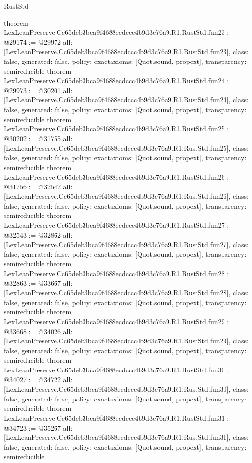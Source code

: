 \begin{lexlean}{RustStd}
\begin{coremodule}
{}
theorem LexLeanPreserve.Cc65deb3bca9f4688ecdccc4b9d3c76a9.R1.RustStd.fun23 : @29174 := @29972 {
  all: [LexLeanPreserve.Cc65deb3bca9f4688ecdccc4b9d3c76a9.R1.RustStd.fun23],
  class: false,
  generated: false,
  policy: exact{axioms: [Quot.sound, propext]},
  transparency: semireducible
}
theorem LexLeanPreserve.Cc65deb3bca9f4688ecdccc4b9d3c76a9.R1.RustStd.fun24 : @29973 := @30201 {
  all: [LexLeanPreserve.Cc65deb3bca9f4688ecdccc4b9d3c76a9.R1.RustStd.fun24],
  class: false,
  generated: false,
  policy: exact{axioms: [Quot.sound, propext]},
  transparency: semireducible
}
theorem LexLeanPreserve.Cc65deb3bca9f4688ecdccc4b9d3c76a9.R1.RustStd.fun25 : @30202 := @31755 {
  all: [LexLeanPreserve.Cc65deb3bca9f4688ecdccc4b9d3c76a9.R1.RustStd.fun25],
  class: false,
  generated: false,
  policy: exact{axioms: [Quot.sound, propext]},
  transparency: semireducible
}
theorem LexLeanPreserve.Cc65deb3bca9f4688ecdccc4b9d3c76a9.R1.RustStd.fun26 : @31756 := @32542 {
  all: [LexLeanPreserve.Cc65deb3bca9f4688ecdccc4b9d3c76a9.R1.RustStd.fun26],
  class: false,
  generated: false,
  policy: exact{axioms: [Quot.sound, propext]},
  transparency: semireducible
}
theorem LexLeanPreserve.Cc65deb3bca9f4688ecdccc4b9d3c76a9.R1.RustStd.fun27 : @32543 := @32862 {
  all: [LexLeanPreserve.Cc65deb3bca9f4688ecdccc4b9d3c76a9.R1.RustStd.fun27],
  class: false,
  generated: false,
  policy: exact{axioms: [Quot.sound, propext]},
  transparency: semireducible
}
theorem LexLeanPreserve.Cc65deb3bca9f4688ecdccc4b9d3c76a9.R1.RustStd.fun28 : @32863 := @33667 {
  all: [LexLeanPreserve.Cc65deb3bca9f4688ecdccc4b9d3c76a9.R1.RustStd.fun28],
  class: false,
  generated: false,
  policy: exact{axioms: [Quot.sound, propext]},
  transparency: semireducible
}
theorem LexLeanPreserve.Cc65deb3bca9f4688ecdccc4b9d3c76a9.R1.RustStd.fun29 : @33668 := @34026 {
  all: [LexLeanPreserve.Cc65deb3bca9f4688ecdccc4b9d3c76a9.R1.RustStd.fun29],
  class: false,
  generated: false,
  policy: exact{axioms: [Quot.sound, propext]},
  transparency: semireducible
}
theorem LexLeanPreserve.Cc65deb3bca9f4688ecdccc4b9d3c76a9.R1.RustStd.fun30 : @34027 := @34722 {
  all: [LexLeanPreserve.Cc65deb3bca9f4688ecdccc4b9d3c76a9.R1.RustStd.fun30],
  class: false,
  generated: false,
  policy: exact{axioms: [Quot.sound, propext]},
  transparency: semireducible
}
theorem LexLeanPreserve.Cc65deb3bca9f4688ecdccc4b9d3c76a9.R1.RustStd.fun31 : @34723 := @35267 {
  all: [LexLeanPreserve.Cc65deb3bca9f4688ecdccc4b9d3c76a9.R1.RustStd.fun31],
  class: false,
  generated: false,
  policy: exact{axioms: [Quot.sound, propext]},
  transparency: semireducible
}
\end{coremodule}
\end{lexlean}
